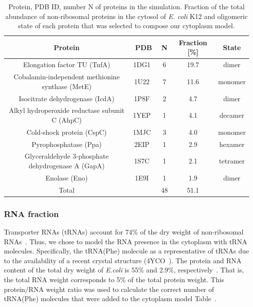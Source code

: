 \documentclass[journal=jcisd8,manuscript=article]{achemso}
\newcommand{\tabref}[1]{Table~\plainref{#1}}
\begin{document}
\begin{table}[H]
\centering
\caption{Protein, PDB ID, number N of proteins in the simulation. 
Fraction of the total abundance of non-ribosomal proteins in the cytosol of {\em
    E. coli} K12 and oligomeric state of each protein that was
  selected to compose our cytoplasm model.}
\label{tbl:protein_fraction}
\begin{tabular}{ccccc}
\hline
Protein & PDB & N & Fraction [\%] & State\\
\hline
Elongation factor TU (TufA) & 1DG1~\cite{Abel1996}       & 6 & 19.7 &  dimer \\
Cobalamin-independent methionine synthase (MetE) & 1U22~\cite{Ferrer2004}     & 7 & 11.6 &  monomer \\
Isocitrate dehydrogenase (IcdA) & 1P8F~\cite{Mesecar2000}    & 2 & 4.7  &  dimer \\
Alkyl hydroperoxide reductase subunit C (AhpC) & 1YEP~\cite{Parsonage2005}  & 1 & 4.1  &  decamer \\
Cold-shock protein (CspC) & 1MJC~\cite{Schindelin1994} & 3 & 4.0  &  monomer \\
Pyrophosphatase (Ppa)  & 2EIP~\cite{Kankare1996}    & 1 & 2.9  &  hexamer \\
Glyceraldehyde 3-phosphate dehydrogenase A (GapA) & 1S7C~\cite{ShinXXX}        & 1 & 2.1  &  tetramer \\
Enolase (Eno)  & 1E9I~\cite{Kuhnel2001}     & 1 & 1.9  &  dimer \\
\hline
Total &                           & 48& 51.1 & \\
\hline
\end{tabular}
\end{table}


\subsubsection{RNA fraction}
Transporter RNAs (tRNAs) account for 74\% of the dry weight of
non-ribosomal RNAs~\cite{phillips2012}. Thus, we chose to model the
RNA presence in the cytoplasm with tRNA molecules. Specifically, 
 the tRNA(Phe) molecule as a representative of tRNAs due to
the availability of a recent crystal
structure (4YCO~\cite{Byrne2015}). The protein and RNA content of the total
dry weight of \textit{E.coli} is 55\% and 2.9\%,
respectively~\cite{phillips2012}. That is, the total RNA weight
corresponds to 5\% of the total protein weight. This protein/RNA
weight ratio was used to calculate the correct number of tRNA(Phe)
molecules that were added to the cytoplasm model
\tabref{tbl:soup_components}.
\end{document}
